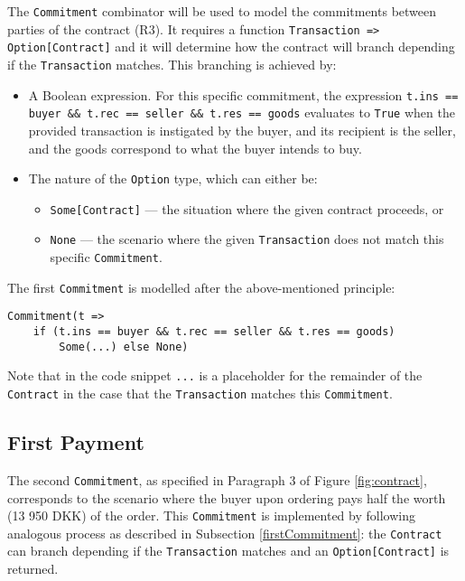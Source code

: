 \documentclass{ituthesis}
\begin{document}
The \texttt{Commitment} combinator will be used to model the commitments between parties of the contract (R3).
It requires a function \texttt{Transaction => Option[Contract]} and it will determine how the contract will branch depending if the \texttt{Transaction} matches. This branching is achieved by:
\begin{itemize}
    \item A Boolean expression. For this specific commitment, the expression \texttt{t.ins == buyer \&\& t.rec == seller \&\& t.res == goods} evaluates to \texttt{True} when the provided transaction is instigated by the buyer, and its recipient is the seller, and the goods correspond to what the buyer intends to buy.
    \item The nature of the \texttt{Option} type, which can either be:
    \begin{itemize}
        \item \texttt{Some[Contract]} --- the situation where the given contract proceeds, or \item \texttt{None} --- the scenario where the given \texttt{Transaction} does not match this specific \texttt{Commitment}.
    \end{itemize}
\end{itemize}

The first \texttt{Commitment} is modelled after the above-mentioned principle:
\begin{lstlisting}
Commitment(t => 
    if (t.ins == buyer && t.rec == seller && t.res == goods) 
        Some(...) else None)
\end{lstlisting}

Note that in the code snippet \texttt{...} is a placeholder for the remainder of the \texttt{Contract} in the case that the \texttt{Transaction} matches this \texttt{Commitment}.

\subsection{First Payment} \label{payment}

The second \texttt{Commitment}, as specified in Paragraph 3 of Figure \ref{fig:contract}, corresponds to the scenario where the buyer upon ordering pays half the worth (13 950 DKK) of the order. This \texttt{Commitment} is implemented by following analogous process as described in Subsection \ref{firstCommitment}: the \texttt{Contract} can branch depending if the \texttt{Transaction} matches and an \texttt{Option[Contract]} is returned.
\end{document}
